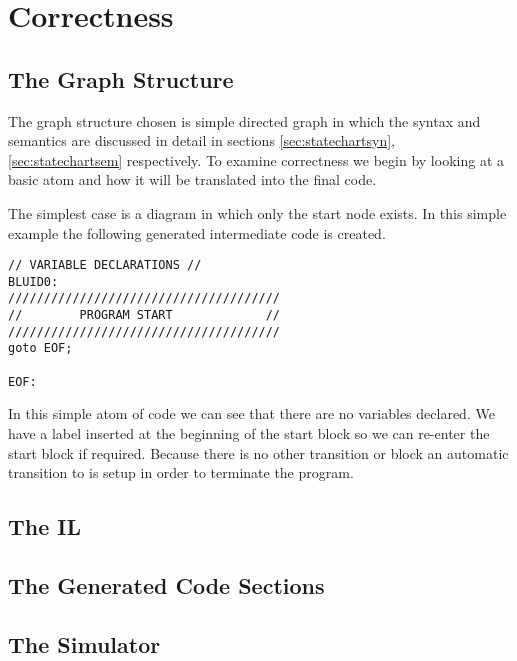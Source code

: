 \section{Correctness}
\subsection{The Graph Structure}
The graph structure chosen is simple directed graph in which the syntax and semantics are discussed in detail in sections \ref{sec:statechartsyn}, \ref{sec:statechartsem} respectively. To examine correctness we begin by looking at a basic atom and how it will be translated into the final code.

The simplest case is a diagram in which only the start node exists.
In this simple example the following generated intermediate code  is created.

\begin{lstlisting}
// VARIABLE DECLARATIONS //
BLUID0:
//////////////////////////////////////
//        PROGRAM START             //
//////////////////////////////////////
goto EOF;

EOF:
\end{lstlisting}

In this simple atom of code we can see that there are no variables declared. We have a label inserted at the beginning of the start block so we can re-enter the start block if required. Because there is no other transition or block an automatic transition to  is setup in order to terminate the program.




\subsection{The IL}
\subsection{The Generated Code Sections}
\subsection{The Simulator}